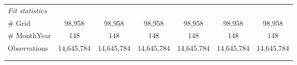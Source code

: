 \begin{table}[htbp]
\begin{tabular}{lcccccc}
      \midrule
      \emph{Fit statistics}\\
      \# Grid                                                 & 98,958        & 98,958        & 98,958        & 98,958        & 98,958        & 98,958\\  
      \# MonthYear                                            & 148           & 148           & 148           & 148           & 148           & 148\\  
      Observations                                            & 14,645,784    & 14,645,784    & 14,645,784    & 14,645,784    & 14,645,784    & 14,645,784\\  
      \midrule \midrule
                                                              &               &               &               &               &               &  \tabularnewline 
      \\
   \end{tabular}
\end{table}


